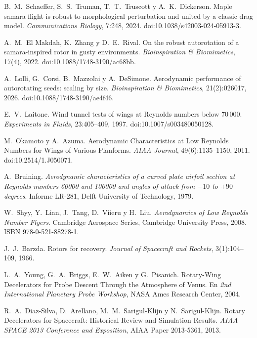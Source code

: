  B.~M.~Schaeffer, S.~S.~Truman, T.~T.~Truscott y
  A.~K.~Dickerson. Maple samara flight is robust to morphological perturbation and united
  by a classic drag model. \emph{Communications Biology}, 7:248, 2024.
  doi:10.1038/s42003-024-05913-3.

 A.~M.~El Makdah, K.~Zhang y D.~E.~Rival. On the robust
  autorotation of a samara-inspired rotor in gusty environments. \emph{Bioinspiration \&
  Biomimetics}, 17(4), 2022. doi:10.1088/1748-3190/ac68bb.

 A.~Lolli, G.~Corsi, B.~Mazzolai y A.~DeSimone.
  Aerodynamic performance of autorotating seeds: scaling by size. \emph{Bioinspiration \&
  Biomimetics}, 21(2):026017, 2026. doi:10.1088/1748-3190/ae4f46.

 E.~V.~Laitone. Wind tunnel tests of wings at Reynolds
  numbers below 70\,000. \emph{Experiments in Fluids}, 23:405--409, 1997.
  doi:10.1007/s003480050128.

 M.~Okamoto y A.~Azuma. Aerodynamic Characteristics at Low
  Reynolds Numbers for Wings of Various Planforms. \emph{AIAA Journal},
  49(6):1135--1150, 2011. doi:10.2514/1.J050071.

 A.~Bruining. \emph{Aerodynamic characteristics of a
  curved plate airfoil section at Reynolds numbers 60000 and 100000 and angles of attack
  from $-10$ to $+90$ degrees}. Informe LR-281, Delft University of Technology, 1979.

 W.~Shyy, Y.~Lian, J.~Tang, D.~Viieru y H.~Liu.
  \emph{Aerodynamics of Low Reynolds Number Flyers}. Cambridge Aerospace Series,
  Cambridge University Press, 2008. ISBN 978-0-521-88278-1.

 J.~J.~Barzda. Rotors for recovery. \emph{Journal of
  Spacecraft and Rockets}, 3(1):104--109, 1966.

 L.~A.~Young, G.~A.~Briggs, E.~W.~Aiken y G.~Pisanich.
  Rotary-Wing Decelerators for Probe Descent Through the Atmosphere of Venus. En
  \emph{2nd International Planetary Probe Workshop}, NASA Ames Research Center, 2004.

 R.~A.~Diaz-Silva, D.~Arellano, M.~M.~Sarigul-Klijn y
  N.~Sarigul-Klijn. Rotary Decelerators for Spacecraft: Historical Review and Simulation
  Results. \emph{AIAA SPACE 2013 Conference and Exposition}, AIAA Paper 2013-5361, 2013.

